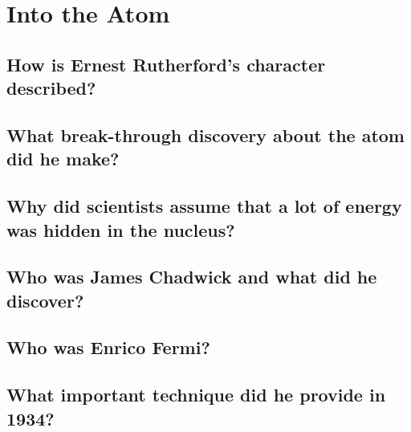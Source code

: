 %

\section{Into the Atom}

\subsection*{How is Ernest Rutherford’s character described?}
\subsection*{What break-through discovery about the atom did he make?}
\subsection*{Why did scientists assume that a lot of energy was hidden in the nucleus?}
\subsection*{Who was James Chadwick and what did he discover?}
\subsection*{Who was Enrico Fermi?}
\subsection*{What important technique did he provide in 1934?}